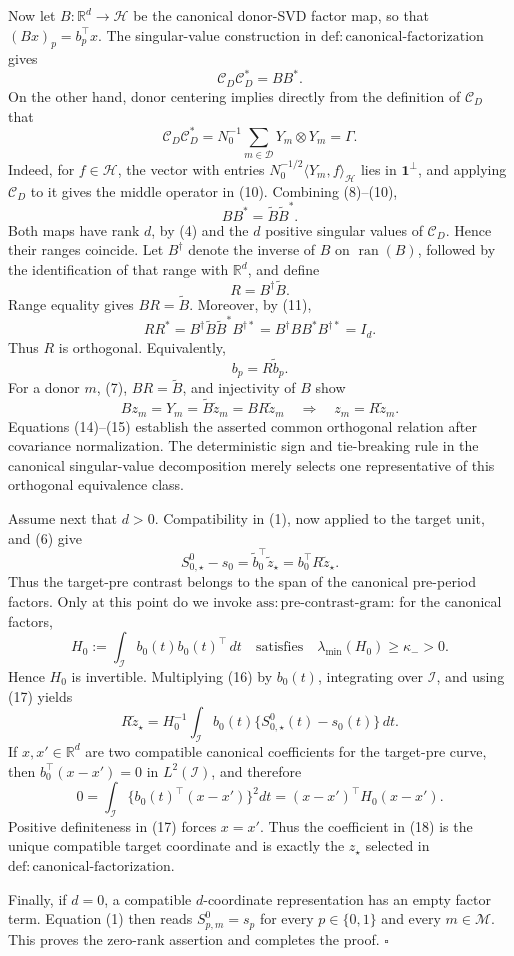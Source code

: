 Now let \(B:\mathbb R^d\to\mathcal H\) be the canonical donor-SVD factor map, so that \((Bx)_p=b_p^\top x\).  The singular-value construction in \(\mathrm{def:canonical\mbox{-}factorization}\) gives
\[
 \mathcal C_D\mathcal C_D^*=BB^*. \tag{9}
\]
On the other hand, donor centering implies directly from the definition of \(\mathcal C_D\) that
\[
 \mathcal C_D\mathcal C_D^*
 =N_0^{-1}\sum_{m\in\mathcal D}Y_m\otimes Y_m
 =\Gamma. \tag{10}
\]
Indeed, for \(f\in\mathcal H\), the vector with entries \(N_0^{-1/2}\langle Y_m,f\rangle_{\mathcal H}\) lies in \(\mathbf 1^\perp\), and applying \(\mathcal C_D\) to it gives the middle operator in (10).  Combining (8)--(10),
\[
 BB^*=\widetilde B\widetilde B^*. \tag{11}
\]
Both maps have rank \(d\), by (4) and the \(d\) positive singular values of \(\mathcal C_D\).  Hence their ranges coincide.  Let \(B^\dagger\) denote the inverse of \(B\) on \(\operatorname{ran}(B)\), followed by the identification of that range with \(\mathbb R^d\), and define
\[
 R=B^\dagger\widetilde B. \tag{12}
\]
Range equality gives \(BR=\widetilde B\).  Moreover, by (11),
\[
 RR^*
 =B^\dagger\widetilde B\widetilde B^*B^{\dagger *}
 =B^\dagger BB^*B^{\dagger *}
 =I_d. \tag{13}
\]
Thus \(R\) is orthogonal.  Equivalently,
\[
 b_p=R\widetilde b_p. \tag{14}
\]
For a donor \(m\), (7), \(BR=\widetilde B\), and injectivity of \(B\) show
\[
 Bz_m=Y_m=\widetilde B\widetilde z_m=BR\widetilde z_m
 \quad\Longrightarrow\quad
 z_m=R\widetilde z_m. \tag{15}
\]
Equations (14)--(15) establish the asserted common orthogonal relation after covariance normalization.  The deterministic sign and tie-breaking rule in the canonical singular-value decomposition merely selects one representative of this orthogonal equivalence class.

Assume next that \(d>0\).  Compatibility in (1), now applied to the target unit, and (6) give
\[
 S^0_{0,\star}-s_0
 =\widetilde b_0^\top\widetilde z_\star
 =b_0^\top R\widetilde z_\star. \tag{16}
\]
Thus the target-pre contrast belongs to the span of the canonical pre-period factors.  Only at this point do we invoke \(\mathrm{ass:pre\mbox{-}contrast\mbox{-}gram}\): for the canonical factors,
\[
 H_0:=\int_{\mathcal I}b_0(t)b_0(t)^\top\,dt
 \quad\text{satisfies}\quad
 \lambda_{\min}(H_0)\geq\kappa_->0. \tag{17}
\]
Hence \(H_0\) is invertible.  Multiplying (16) by \(b_0(t)\), integrating over \(\mathcal I\), and using (17) yields
\[
 R\widetilde z_\star
 =H_0^{-1}\int_{\mathcal I}b_0(t)
 \{S^0_{0,\star}(t)-s_0(t)\}\,dt. \tag{18}
\]
If \(x,x'\in\mathbb R^d\) are two compatible canonical coefficients for the target-pre curve, then \(b_0^\top(x-x')=0\) in \(L^2(\mathcal I)\), and therefore
\[
 0=\int_{\mathcal I}\{b_0(t)^\top(x-x')\}^2dt
 =(x-x')^\top H_0(x-x'). \tag{19}
\]
Positive definiteness in (17) forces \(x=x'\).  Thus the coefficient in (18) is the unique compatible target coordinate and is exactly the \(z_\star\) selected in \(\mathrm{def:canonical\mbox{-}factorization}\).

Finally, if \(d=0\), a compatible \(d\)-coordinate representation has an empty factor term.  Equation (1) then reads \(S^0_{p,m}=s_p\) for every \(p\in\{0,1\}\) and every \(m\in\mathcal M\).  This proves the zero-rank assertion and completes the proof. \(\square\)